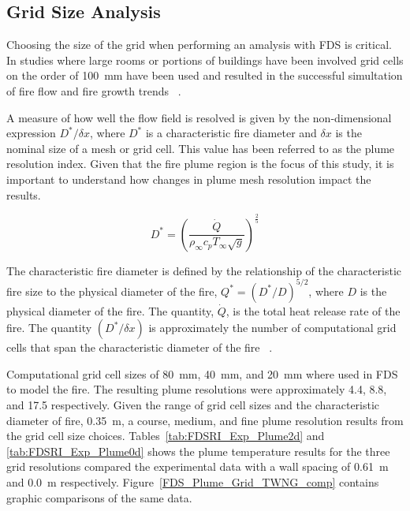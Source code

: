 \documentclass[twoside]{uocthesis}
\begin{document}
\subsection{Grid Size Analysis}

Choosing the size of the grid when performing an amalysis with FDS is critical. In studies where large rooms or portions of buildings have been involved grid cells on the order of 100~mm have been used and resulted in the successful simultation of fire flow and fire growth trends ~\cite{Grosshandler:Station,Vettori:2000,Barowy:2012,Overholt:San_Francisco,Weinschenk:Chicago}.

 A measure of how well the flow field is resolved is given by the non-dimensional expression ${D^*}/{\delta x}$, where $D^*$ is a characteristic fire diameter and $\delta x$ is the nominal size of a mesh or grid cell. This value has been referred to as the plume resolution index. Given that the fire plume region is the focus of this study, it is important to understand how changes in plume mesh resolution impact the results.    

\begin{equation}
 D^* = \left(
     \frac{\dot Q}{\rho_\infty  c_p  T_\infty  \sqrt{g} }
     \right)^\frac{2}{5} 
 \end{equation}


The characteristic fire diameter is defined by the relationship of the characteristic fire size to the physical diameter of the fire, ${Q^*} = ({D^*}/{D})^{5/2}$, where $D$ is the physical diameter of the fire. The quantity, $\dot Q$, is the total heat release rate of the fire. The quantity $({D^*}/{\delta x})$ is approximately the number of computational grid cells that span the characteristic diameter of the fire ~\cite{FDS_Users_Guide,FDS_Validation_Guide}.  

Computational grid cell sizes of 80~mm, 40~mm, and 20~mm where used in FDS to model the fire.  The resulting plume resolutions were approximately 4.4, 8.8, and 17.5 respectively. Given the range of grid cell sizes and the characteristic diameter of fire, 0.35~m, a course, medium, and fine plume resolution results from the grid cell size choices. Tables~\ref{tab:FDSRI_Exp_Plume2d} and \ref{tab:FDSRI_Exp_Plume0d} shows the plume temperature results for the three grid resolutions compared the experimental data with a wall spacing of 0.61~m and 0.0~m respectively. Figure~\ref{FDS_Plume_Grid_TWNG_comp} contains graphic comparisons of the same data.   
\end{document}
